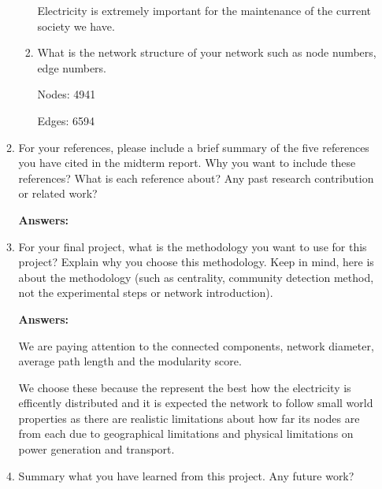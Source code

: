 \documentclass{amsart}
\theoremstyle{definition}
\theoremstyle{remark}
\numberwithin{equation}{section}
\begin{document}
\begin{enumerate}
\begin{enumerate}
\begin{enumerate}
Electricity is extremely important for the maintenance of the current society we have. \vspace{0.2cm}

\item What is the network structure of your network such as node numbers, edge numbers. \vspace{0.2cm}

Nodes: 4941

Edges: 6594

\end{enumerate}


\vspace{1cm}

\item 
For your references, please include a brief summary of the five references you have cited in the midterm report. Why you want to include these references? What is each reference about? Any past research contribution or related work?
\vspace{1cm}

\textbf{Answers:}



\vspace{1cm}

\item For your final project, what is the methodology you want to use for this project? Explain why you choose this methodology. Keep in mind, here is about the methodology (such as centrality, community detection method, not the experimental steps or network introduction). 
\vspace{0.5cm}

\textbf{Answers:}

We are paying attention to the connected components, network diameter, average path length and the modularity score. \vspace{0.2cm}

We choose these because the represent the best how the electricity is efficently distributed and it is expected the network to follow small world properties as there are realistic limitations about how far its nodes are from each due to geographical limitations and physical limitations on power generation and transport.

\vspace{0.5cm}

\item Summary what you have learned from this project. Any future work? 
\vspace{0.5cm}


\end{enumerate}
\end{enumerate}
\end{document}
